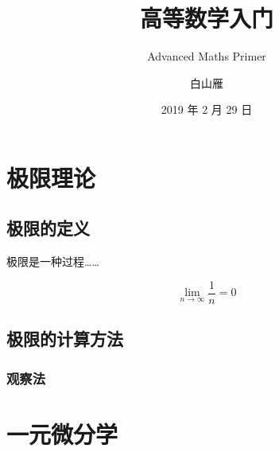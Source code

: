 \documentclass[
    b5paper,  %
    decoration,  %
]{qyxf-book}
\title{高等数学入门}
\subtitle{Advanced Maths Primer}
\author{白山雁}
\date{2019 年 2 月 29 日}
\begin{document}
\maketitle

\tableofcontents

\chapter{极限理论}
\section{极限的定义}

极限是一种过程……

\[ \lim_{n\to\infty}\frac1n = 0 \]

\section{极限的计算方法}
\subsection{观察法}

\chapter{一元微分学}
\end{document}
